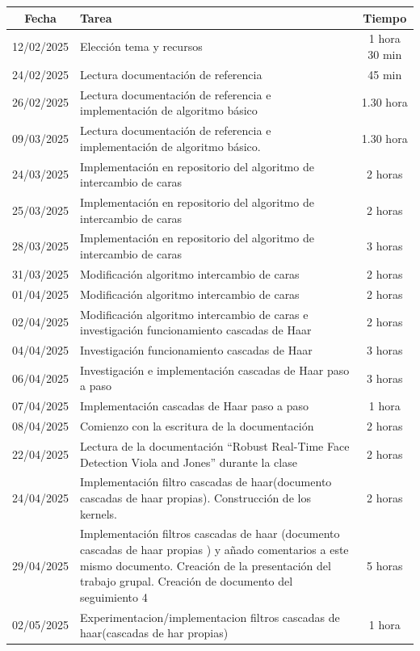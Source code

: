 \documentclass[a4paper]{article}
\begin{document}
\begin{table}[H]
\centering
\begin{tabular}{|c|p{10cm}|c|}
\hline
\textbf{Fecha} & \textbf{Tarea} & \textbf{Tiempo} \\
\hline
12/02/2025 & Elección tema y recursos & 1 hora 30 min \\
24/02/2025 & Lectura documentación de referencia & 45 min \\
26/02/2025 & Lectura documentación de referencia e implementación de algoritmo básico & 1.30 hora \\
09/03/2025 & Lectura documentación de referencia e implementación de algoritmo básico. & 1.30 hora \\
24/03/2025 & Implementación en repositorio del algoritmo de intercambio de caras & 2 horas \\
25/03/2025 & Implementación en repositorio del algoritmo de intercambio de caras & 2 horas \\
28/03/2025 & Implementación en repositorio del algoritmo de intercambio de caras & 3 horas \\
31/03/2025 & Modificación algoritmo intercambio de caras & 2 horas \\
01/04/2025 & Modificación algoritmo intercambio de caras & 2 horas \\
02/04/2025 & Modificación algoritmo intercambio de caras e investigación funcionamiento cascadas de Haar & 2 horas \\
04/04/2025 & Investigación funcionamiento cascadas de Haar & 3 horas \\
06/04/2025 & Investigación e implementación cascadas de Haar paso a paso & 3 horas \\
07/04/2025 & Implementación cascadas de Haar paso a paso & 1 hora \\
08/04/2025 & Comienzo con la escritura de la documentación & 2 horas \\
22/04/2025 & Lectura de la documentación “Robust Real-Time Face Detection Viola and Jones” durante la clase & 2 horas \\
24/04/2025 & Implementación filtro cascadas de haar(documento cascadas de haar propias). Construcción de los kernels. & 2 horas \\
29/04/2025 & Implementación filtros cascadas de haar (documento cascadas de haar propias )  y añado comentarios a este mismo documento. Creación de la presentación del trabajo grupal. Creación de documento del seguimiento 4 & 5 horas \\
02/05/2025 & Experimentacion/implementacion filtros cascadas de haar(cascadas de har propias) & 1 hora \\

\end{tabular}
\end{table}
\end{document}
